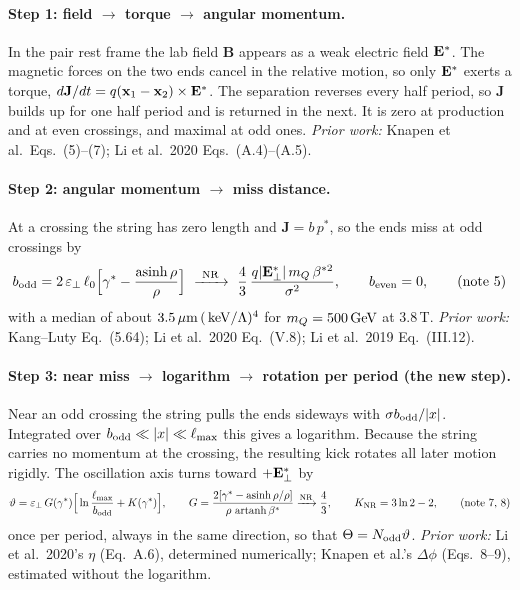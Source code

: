 \documentclass[11pt]{article}
\begin{document}
\paragraph{Step 1: field $\to$ torque $\to$ angular momentum.} In the pair rest frame the lab field $\mathbf B$ appears as
a weak electric field $\mathbf{E}^*$. The magnetic forces on the two ends cancel in the relative motion, so only $\mathbf{E}^*$
exerts a torque, $d\mathbf J/dt=q(\mathbf x_1-\mathbf x_2)\times\mathbf{E}^*$. The separation reverses every half period, so
$\mathbf J$ builds up for one half period and is returned in the next. It is zero at production and at even crossings, and maximal at odd ones.
\emph{Prior work:} Knapen et al.\ Eqs.~(5)--(7); Li et al.\ 2020 Eqs.~(A.4)--(A.5).

\paragraph{Step 2: angular momentum $\to$ miss distance.} At a crossing the string has zero length and $\mathbf J=b\,p^*$, so the ends miss at odd
crossings by
\begin{equation}
  \bodd = 2\,\epsp\,\lzero\Big[\gst-\frac{\operatorname{asinh}\rho}{\rho}\Big]
  \ \xrightarrow{\ \rm NR\ }\ \frac43\,\frac{q|\Estar_\perp|\,m_Q\,\beta^{*2}}{\sigma^2},
  \qquad b_{\rm even}=0, \tag{note 5}
\end{equation}
with a median of about $3.5\,\mu\mathrm{m}\,(\,\mathrm{keV}/\Lambda)^4$ for $m_Q=500\,\mathrm{GeV}$ at 3.8\,T.
\emph{Prior work:} Kang--Luty Eq.~(5.64); Li et al.\ 2020 Eq.~(V.8); Li et al.\ 2019 Eq.~(III.12).

\paragraph{Step 3: near miss $\to$ logarithm $\to$ rotation per period (the new step).} Near an odd crossing the
string pulls the ends sideways with $\sigma b_{\rm odd}/|x|$. Integrated over $b_{\rm odd}\ll|x|\ll\ell_{\max}$ this gives a logarithm. Because the string carries no
momentum at the crossing, the resulting kick rotates all later motion rigidly. The oscillation axis turns toward $+\mathbf{E}^*_\perp$ by
\begin{equation}
  \vartheta=\varepsilon_\perp\,G(\gamma^*)\Big[\ln\frac{\ell_{\max}}{b_{\rm odd}}+K(\gamma^*)\Big],\qquad
  G=\frac{2[\gamma^*-\operatorname{asinh}\rho/\rho]}{\rho\,\operatorname{artanh}\beta^*}\xrightarrow{\rm NR}\frac43,\qquad
  K_{\rm NR}=3\ln2-2 , \tag{note 7, 8}
\end{equation}
once per period, always in the same direction, so that $\Theta=N_{\rm odd}\vartheta$.
\emph{Prior work:} Li et al.\ 2020's $\eta$ (Eq.~A.6), determined numerically; Knapen et al.'s $\Delta\phi$ (Eqs.~8--9),
estimated without the logarithm.
\end{document}
